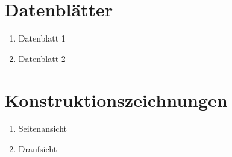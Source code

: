 \documentclass[12pt,a4paper]{scrreprt}
\begin{document}
\chapter{Datenblätter}
\begin{enumerate}
      \item Datenblatt 1
      \item Datenblatt 2
\end{enumerate}



\chapter{Konstruktionszeichnungen}
\begin{enumerate}
      \item Seitenansicht
      \item Draufsicht
\end{enumerate}
%
%
\end{document}

